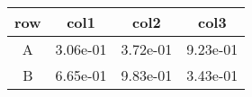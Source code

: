 \begin{tabular}{cccc}
\toprule
row&col1&col2&col3\tabularnewline
\midrule
A&3.06e-01&3.72e-01&9.23e-01\tabularnewline
B&6.65e-01&9.83e-01&3.43e-01\tabularnewline
\bottomrule
\end{tabular}
